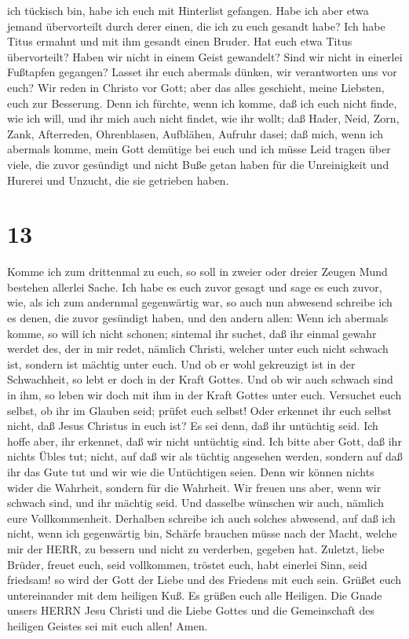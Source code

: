 ich tückisch bin, habe ich euch mit Hinterlist gefangen. 
Habe ich aber etwa jemand übervorteilt durch derer einen, die ich zu
euch gesandt habe?  Ich habe Titus ermahnt und mit ihm
gesandt einen Bruder. Hat euch etwa Titus übervorteilt? Haben wir nicht
in einem Geist gewandelt? Sind wir nicht in einerlei Fußtapfen gegangen?
 Lasset ihr euch abermals dünken, wir verantworten uns vor
euch? Wir reden in Christo vor Gott; aber das alles geschieht, meine
Liebsten, euch zur Besserung.  Denn ich fürchte, wenn ich
komme, daß ich euch nicht finde, wie ich will, und ihr mich auch nicht
findet, wie ihr wollt; daß Hader, Neid, Zorn, Zank, Afterreden,
Ohrenblasen, Aufblähen, Aufruhr dasei;  daß mich, wenn ich
abermals komme, mein Gott demütige bei euch und ich müsse Leid tragen
über viele, die zuvor gesündigt und nicht Buße getan haben für die
Unreinigkeit und Hurerei und Unzucht, die sie getrieben haben.

\hypertarget{section-12}{%
\section{13}\label{section-12}}

 Komme ich zum drittenmal zu euch, so soll in zweier oder
dreier Zeugen Mund bestehen allerlei Sache.  Ich habe es
euch zuvor gesagt und sage es euch zuvor, wie, als ich zum andernmal
gegenwärtig war, so auch nun abwesend schreibe ich es denen, die zuvor
gesündigt haben, und den andern allen: Wenn ich abermals komme, so will
ich nicht schonen;  sintemal ihr suchet, daß ihr einmal
gewahr werdet des, der in mir redet, nämlich Christi, welcher unter euch
nicht schwach ist, sondern ist mächtig unter euch.  Und ob
er wohl gekreuzigt ist in der Schwachheit, so lebt er doch in der Kraft
Gottes. Und ob wir auch schwach sind in ihm, so leben wir doch mit ihm
in der Kraft Gottes unter euch.  Versuchet euch selbst, ob
ihr im Glauben seid; prüfet euch selbst! Oder erkennet ihr euch selbst
nicht, daß Jesus Christus in euch ist? Es sei denn, daß ihr untüchtig
seid.  Ich hoffe aber, ihr erkennet, daß wir nicht untüchtig
sind.  Ich bitte aber Gott, daß ihr nichts Übles tut; nicht,
auf daß wir als tüchtig angesehen werden, sondern auf daß ihr das Gute
tut und wir wie die Untüchtigen seien.  Denn wir können
nichts wider die Wahrheit, sondern für die Wahrheit.  Wir
freuen uns aber, wenn wir schwach sind, und ihr mächtig seid. Und
dasselbe wünschen wir auch, nämlich eure Vollkommenheit. 
Derhalben schreibe ich auch solches abwesend, auf daß ich nicht, wenn
ich gegenwärtig bin, Schärfe brauchen müsse nach der Macht, welche mir
der HERR, zu bessern und nicht zu verderben, gegeben hat. 
Zuletzt, liebe Brüder, freuet euch, seid vollkommen, tröstet euch, habt
einerlei Sinn, seid friedsam! so wird der Gott der Liebe und des
Friedens mit euch sein.  Grüßet euch untereinander mit dem
heiligen Kuß.  Es grüßen euch alle Heiligen. 
Die Gnade unsers HERRN Jesu Christi und die Liebe Gottes und die
Gemeinschaft des heiligen Geistes sei mit euch allen! Amen.

